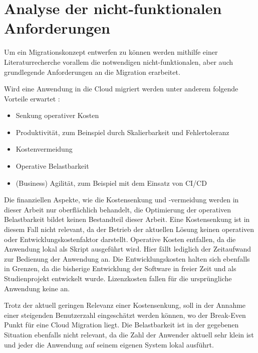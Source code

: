 \section{Analyse der nicht-funktionalen Anforderungen}
\label{sec:anforderungsanalyse}


Um ein Migrationskonzept entwerfen zu können %
werden mithilfe einer Literaturrecherche vorallem die notwendigen nicht-funktionalen, aber auch grundlegende Anforderungen an die Migration erarbeitet.

Wird eine Anwendung in die Cloud migriert werden unter anderem folgende Vorteile erwartet \cite[Vgl. auch im Folgenden][03:23-05:36min]{AWS2019}:
\begin{itemize}
\item Senkung operativer Kosten
\item Produktivität, zum Beinspiel durch Skalierbarkeit und Fehlertoleranz
\item Kostenvermeidung
\item Operative Belastbarkeit
\item (Business) Agilität, zum Beispiel mit dem Einsatz von CI/CD
\end{itemize}

Die finanziellen Aspekte, wie die Kostensenkung und -vermeidung werden in dieser Arbeit nur oberflächlich behandelt, die Optimierung der operativen Belastbarkeit bildet keinen Bestandteil dieser Arbeit. Eine Kostensenkung ist in diesem Fall nicht relevant, da der Betrieb der aktuellen Lösung keinen operativen oder Entwicklungskostenfaktor darstellt. Operative Kosten entfallen, da die Anwendung lokal als Skript ausgeführt wird. Hier fällt lediglich der Zeitaufwand zur Bedienung der Anwendung an. Die Entwicklungskosten halten sich ebenfalls in Grenzen, da die bisherige Entwicklung der Software in freier Zeit und als Studienprojekt entwickelt wurde. Lizenzkosten fallen für die ursprüngliche Anwendung keine an.

Trotz der aktuell geringen Relevanz einer Kostensenkung, soll in der Annahme einer steigenden Benutzerzahl eingeschätzt werden können, wo der Break-Even Punkt für eine Cloud Migration liegt. Die Belastbarkeit ist in der gegebenen Situation ebenfalls nicht relevant, da die Zahl der Anwender aktuell sehr klein ist und jeder die Anwendung auf seinem eigenen System lokal ausführt.

